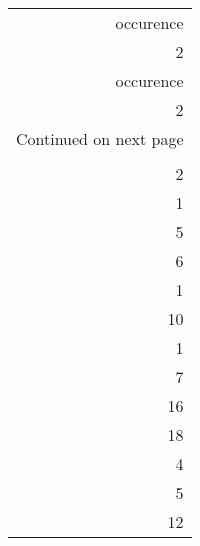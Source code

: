 \begin{longtable}{r}
\toprule
 occurence \\
         2 \\
\midrule
\endfirsthead

\toprule
 occurence \\
         2 \\
\midrule
\endhead
\midrule
\multicolumn{1}{r}{{Continued on next page}} \\
\midrule
\endfoot

\bottomrule
\endlastfoot
         2 \\
         2 \\
         1 \\
         5 \\
         6 \\
         1 \\
        10 \\
         1 \\
         7 \\
        16 \\
        18 \\
         4 \\
         5 \\
        12 \\
\end{longtable}
